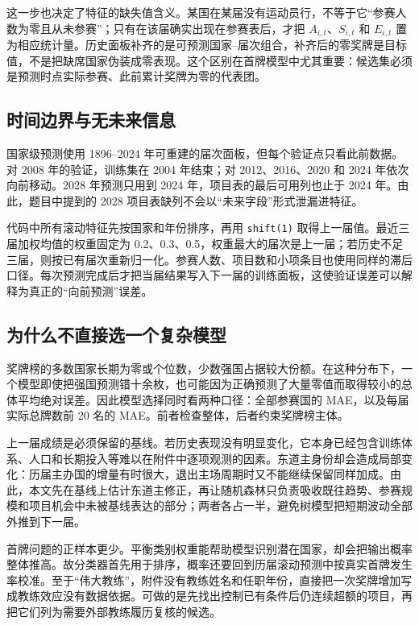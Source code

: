 \documentclass[UTF8,11pt,a4paper]{ctexart}
\begin{document}
这一步也决定了特征的缺失值含义。某国在某届没有运动员行，不等于它“参赛人数为零且从未参赛”；只有在该届确实出现在参赛表后，才把 $A_{i,t}$、$S_{i,t}$ 和 $E_{i,t}$ 置为相应统计量。历史面板补齐的是可预测国家--届次组合，补齐后的零奖牌是目标值，不是把缺席国家伪装成零表现。这个区别在首牌模型中尤其重要：候选集必须是预测时点实际参赛、此前累计奖牌为零的代表团。

\subsection{时间边界与无未来信息}

国家级预测使用 1896--2024 年可重建的届次面板，但每个验证点只看此前数据。对 2008 年的验证，训练集在 2004 年结束；对 2012、2016、2020 和 2024 年依次向前移动。2028 年预测只用到 2024 年，项目表的最后可用列也止于 2024 年。由此，题目中提到的 2028 项目表缺列不会以“未来字段”形式泄漏进特征。

代码中所有滚动特征先按国家和年份排序，再用 \texttt{shift(1)} 取得上一届值。最近三届加权均值的权重固定为 0.2、0.3、0.5，权重最大的届次是上一届；若历史不足三届，则按已有届次重新归一化。参赛人数、项目数和小项条目也使用同样的滞后口径。每次预测完成后才把当届结果写入下一届的训练面板，这使验证误差可以解释为真正的“向前预测”误差。

\subsection{为什么不直接选一个复杂模型}

奖牌榜的多数国家长期为零或个位数，少数强国占据较大份额。在这种分布下，一个模型即使把强国预测错十余枚，也可能因为正确预测了大量零值而取得较小的总体平均绝对误差。因此模型选择同时看两种口径：全部参赛国的 MAE，以及每届实际总牌数前 20 名的 MAE。前者检查整体，后者约束奖牌榜主体。

上一届成绩是必须保留的基线。若历史表现没有明显变化，它本身已经包含训练体系、人口和长期投入等难以在附件中逐项观测的因素。东道主身份却会造成局部变化：历届主办国的增量有时很大，退出主场周期时又不能继续保留同样加成。由此，本文先在基线上估计东道主修正，再让随机森林只负责吸收既往趋势、参赛规模和项目机会中未被基线表达的部分；两者各占一半，避免树模型把短期波动全部外推到下一届。

首牌问题的正样本更少。平衡类别权重能帮助模型识别潜在国家，却会把输出概率整体推高。故分类器首先用于排序，概率还要回到历届滚动预测中按真实首牌发生率校准。至于“伟大教练”，附件没有教练姓名和任职年份，直接把一次奖牌增加写成教练效应没有数据依据。可做的是先找出控制已有条件后仍连续超额的项目，再把它们列为需要外部教练履历复核的候选。
\end{document}

